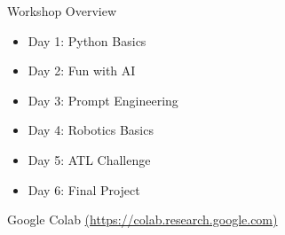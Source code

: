 \begin{frame}{Workshop Overview}
    \begin{itemize}
      \item Day 1: Python Basics
      \item Day 2: Fun with AI
      \item Day 3: Prompt Engineering
      \item Day 4: Robotics Basics
      \item Day 5: ATL Challenge
      \item Day 6: Final Project
    \end{itemize}
    
    \vspace{0.5cm}
     Google Colab \href{https://colab.research.google.com}{(https://colab.research.google.com)}
  \end{frame}